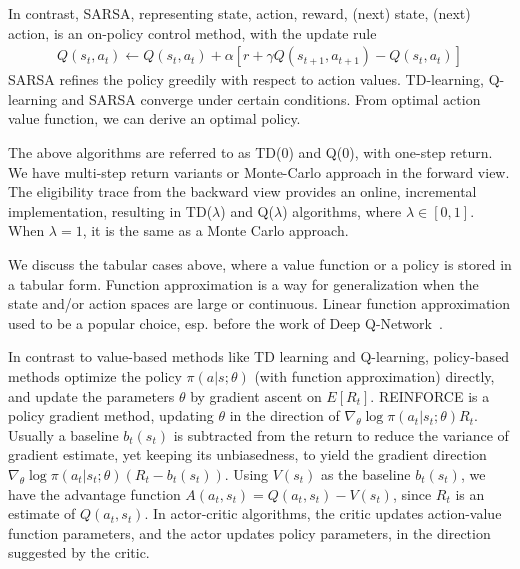 In contrast, SARSA, representing state, action, reward, (next) state, (next) action, is an on-policy control method, with the update rule
\begin{align*}
    Q(s_t, a_t) \leftarrow Q(s_t, a_t) + \alpha [r + \gamma Q(s_{t+1}, a_{t+1}) - Q(s_t,a_t)]
\end{align*}
SARSA refines the policy greedily with respect to action values. TD-learning, Q-learning and SARSA converge under certain conditions. From optimal action value function, we can derive an optimal policy. 

The above algorithms are referred to as TD(0) and Q(0), with one-step return. We have multi-step return variants or Monte-Carlo approach in the forward view. The eligibility trace from the backward view provides an online, incremental implementation, resulting in TD($\lambda$) and Q($\lambda$) algorithms, where $\lambda \in[0,1]$. When $\lambda = 1$, it is the same as a Monte Carlo approach. 

We discuss the tabular cases above, where a value function or a policy is stored in a tabular form. Function approximation is a way for generalization when the state and/or action spaces are large or continuous. Linear function approximation used to be a popular choice, esp. before the work of Deep Q-Network~\citep{Atari}.


In contrast to value-based methods like TD learning and Q-learning, policy-based methods optimize the policy $\pi(a|s; \theta)$ (with function approximation) directly, and update the parameters $\theta$ by gradient ascent on $E[R_t]$. REINFORCE is a policy gradient method, updating $\theta$ in the direction of $\nabla_{\theta} \log \pi(a_t|s_t; \theta) R_t$. Usually a baseline $b_t(s_t)$ is subtracted from the return to reduce the variance of gradient estimate, yet keeping its unbiasedness, to yield the gradient direction $\nabla_{\theta} \log \pi(a_t|s_t; \theta) (R_t - b_t(s_t))$. Using $V(s_t)$ as the baseline $b_t(s_t)$, we have the advantage function $A(a_t, s_t) = Q(a_t, s_t) - V(s_t)$, since $R_t$ is an estimate of $Q(a_t, s_t)$. In actor-critic algorithms, the critic updates action-value function parameters, and the actor updates policy parameters, in the direction suggested by the critic.

